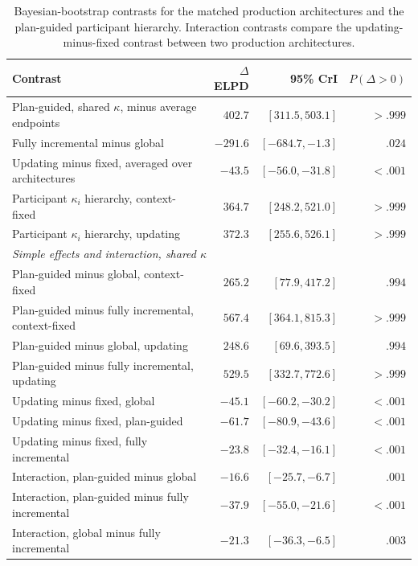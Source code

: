 \documentclass[10pt,a4paper,fleqn]{article}
\begin{document}
\begin{table}[H]
\centering
\caption{Bayesian-bootstrap contrasts for the matched production architectures and the plan-guided participant hierarchy. Interaction contrasts compare the updating-minus-fixed contrast between two production architectures.}
\label{tab:final-architecture-contrasts}
\footnotesize
\begin{tabularx}{\textwidth}{Xrrr}
\toprule
Contrast & $\Delta$ELPD & 95\% CrI & $P(\Delta>0)$ \\
\midrule
Plan-guided, shared $\kappa$, minus average endpoints & $402.7$ & $[311.5,503.1]$ & $>.999$ \\
Fully incremental minus global & $-291.6$ & $[-684.7,-1.3]$ & $.024$ \\
Updating minus fixed, averaged over architectures & $-43.5$ & $[-56.0,-31.8]$ & $<.001$ \\
Participant $\kappa_i$ hierarchy, context-fixed & $364.7$ & $[248.2,521.0]$ & $>.999$ \\
Participant $\kappa_i$ hierarchy, updating & $372.3$ & $[255.6,526.1]$ & $>.999$ \\
\midrule
\multicolumn{4}{l}{\emph{Simple effects and interaction, shared $\kappa$}} \\
Plan-guided minus global, context-fixed & $265.2$ & $[77.9,417.2]$ & $.994$ \\
Plan-guided minus fully incremental, context-fixed & $567.4$ & $[364.1,815.3]$ & $>.999$ \\
Plan-guided minus global, updating & $248.6$ & $[69.6,393.5]$ & $.994$ \\
Plan-guided minus fully incremental, updating & $529.5$ & $[332.7,772.6]$ & $>.999$ \\
Updating minus fixed, global & $-45.1$ & $[-60.2,-30.2]$ & $<.001$ \\
Updating minus fixed, plan-guided & $-61.7$ & $[-80.9,-43.6]$ & $<.001$ \\
Updating minus fixed, fully incremental & $-23.8$ & $[-32.4,-16.1]$ & $<.001$ \\
Interaction, plan-guided minus global & $-16.6$ & $[-25.7,-6.7]$ & $.001$ \\
Interaction, plan-guided minus fully incremental & $-37.9$ & $[-55.0,-21.6]$ & $<.001$ \\
Interaction, global minus fully incremental & $-21.3$ & $[-36.3,-6.5]$ & $.003$ \\
\bottomrule
\end{tabularx}
\end{table}
\end{document}
